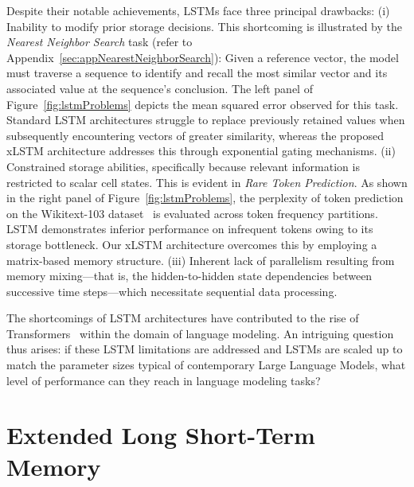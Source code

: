 Despite their notable achievements, LSTMs face three principal drawbacks: (i) Inability to modify prior storage decisions. This shortcoming is illustrated by the {\it Nearest Neighbor Search} task (refer to Appendix~\ref{sec:appNearestNeighborSearch}): Given a reference vector, the model must traverse a sequence to identify and recall the most similar vector and its associated value at the sequence’s conclusion. The left panel of Figure~\ref{fig:lstmProblems} depicts the mean squared error observed for this task. Standard LSTM architectures struggle to replace previously retained values when subsequently encountering vectors of greater similarity, whereas the proposed xLSTM architecture addresses this through exponential gating mechanisms. (ii) Constrained storage abilities, specifically because relevant information is restricted to scalar cell states. This is evident in {\it Rare Token Prediction}. As shown in the right panel of Figure~\ref{fig:lstmProblems}, the perplexity of token prediction on the Wikitext-103 dataset~\citep{Merity:17} is evaluated across token frequency partitions. LSTM demonstrates inferior performance on infrequent tokens owing to its storage bottleneck. Our xLSTM architecture overcomes this by employing a matrix-based memory structure. (iii) Inherent lack of parallelism resulting from memory mixing—that is, the hidden-to-hidden state dependencies between successive time steps—which necessitate sequential data processing.

The shortcomings of LSTM architectures have contributed to the rise of Transformers~\citep{Vaswani:17} within the domain of language modeling. An intriguing question thus arises: if these LSTM limitations are addressed and LSTMs are scaled up to match the parameter sizes typical of contemporary Large Language Models, what level of performance can they reach in language modeling tasks?

\section{Extended Long Short-Term Memory}
\label{sec:xLSTM}

